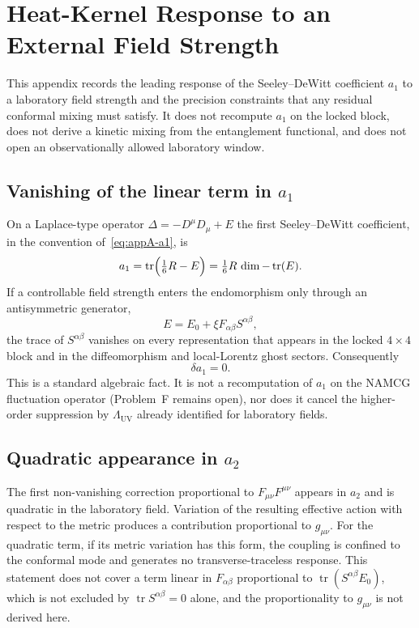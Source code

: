 \chapter{Heat-Kernel Response to an External Field Strength}
\label{app:heat_kernel_mixing}

This appendix records the leading response of the Seeley--DeWitt
coefficient \(a_1\) to a laboratory field strength and the precision
constraints that any residual conformal mixing must satisfy. It does
not recompute \(a_1\) on the locked block, does not derive a kinetic
mixing from the entanglement functional, and does not open an
observationally allowed laboratory window.

\section{Vanishing of the linear term in \(a_1\)}
\label{sec:a1-null}

On a Laplace-type operator \(\Delta=-D^\mu D_\mu+E\) the first
Seeley--DeWitt coefficient, in the convention of~\eqref{eq:appA-a1}, is
\begin{equation}
  a_1=\operatorname{tr}\Bigl(\tfrac16 R-E\Bigr)
     =\tfrac16 R\,\dim-\operatorname{tr}(E).
\end{equation}
If a controllable field strength enters the endomorphism only through
an antisymmetric generator,
\begin{equation}
  E=E_0+\xi F_{\alpha\beta}S^{\alpha\beta},
\end{equation}
the trace of \(S^{\alpha\beta}\) vanishes on every representation that
appears in the locked \(4\times 4\) block and in the diffeomorphism
and local-Lorentz ghost sectors. Consequently
\begin{equation}
  \delta a_1=0.
\end{equation}
This is a standard algebraic fact. It is not a recomputation of
\(a_1\) on the NAMCG fluctuation operator (Problem~F remains open),
nor does it cancel the higher-order suppression by
\(\Lambda_{\mathrm{UV}}\) already identified for laboratory fields.

\section{Quadratic appearance in \(a_2\)}
\label{sec:a2}

The first non-vanishing correction proportional to
\(F_{\mu\nu}F^{\mu\nu}\) appears in \(a_2\) and is quadratic in the
laboratory field.
Variation of the resulting effective action with respect to the
metric produces a contribution proportional to \(g_{\mu\nu}\). For the quadratic term, if its metric variation has this form, the
coupling is confined to the conformal mode and generates no
transverse-traceless response. This statement does not cover a term
linear in \(F_{\alpha\beta}\) proportional to
\(\operatorname{tr}(S^{\alpha\beta}E_0)\), which is not excluded by
\(\operatorname{tr}S^{\alpha\beta}=0\) alone, and the proportionality to
\(g_{\mu\nu}\) is not derived here.

